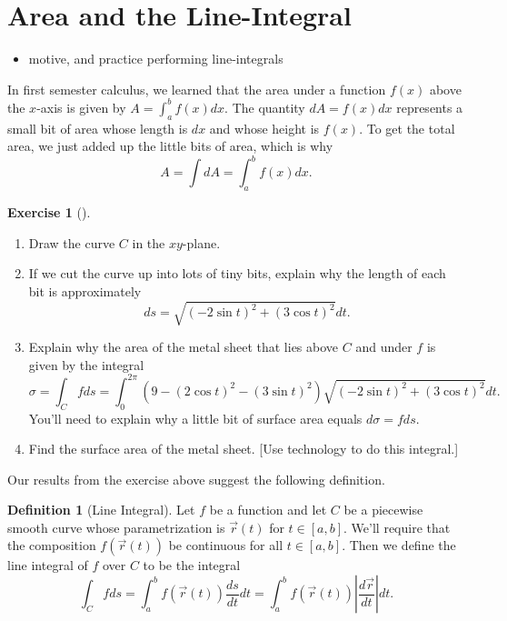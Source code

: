 \documentclass[10pt,]{book}
\theoremstyle{plain}
\theoremstyle{definition}
\newtheorem{definition}[theorem]{Definition}
\theoremstyle{definition}
\theoremstyle{definition}
\theoremstyle{definition}
\newtheorem{exploration}[project]{Exercise}
\theoremstyle{definition}
\numberwithin{equation}{section}
\begin{document}
\section[{Area and the Line-Integral}]{Area and the Line-Integral}\label{section-30}
\leavevmode%
\begin{itemize}[label=\textbullet]
\item{}motive, and practice performing line-integrals%
\end{itemize}
In first semester calculus, we learned that the area under a function \(f(x)\) above the \(x\)-axis is given by \(A = \int_a^b f(x) dx\). The quantity \(dA= f(x) dx\) represents a small bit of area whose length is \(dx\) and whose height is \(f(x)\). To get the total area, we just added up the little bits of area, which is why%
\begin{equation*}
A=\int dA = \int_a^b f(x) dx.
\end{equation*}
%
\begin{exploration}[]\label{exploration-196}
\leavevmode%
\begin{enumerate}[font=\bfseries,label=(\alph*),ref=\alph*]
\item\label{task-500} Draw the curve \(C\) in the \(xy\)-plane.%
\item\label{task-501} If we cut the curve up into lots of tiny bits, explain why the length of each bit is approximately%
\begin{equation*}
ds=\sqrt{(-2\sin t)^2+(3\cos t)^2}dt.
\end{equation*}
%
\item\label{task-502} Explain why the area of the metal sheet that lies above \(C\) and under \(f\) is given by the integral%
\begin{equation*}
\sigma = \int_C f ds = \int_0^{2\pi}(9-(2\cos t)^2-(3\sin t)^2)\sqrt{(-2\sin t)^2+(3\cos t)^2}dt.
\end{equation*}
You'll need to explain why a little bit of surface area equals \(d\sigma =fds\).%
\item\label{task-503} Find the surface area of the metal sheet. [Use technology to do this integral.]%
\end{enumerate}
\end{exploration}
Our results from the exercise above suggest the following definition.%
\begin{definition}[{Line Integral}]\label{definition-34}
Let \(f\) be a function and let \(C\) be a piecewise smooth curve whose parametrization is \(\vec r(t)\) for \(t\in[a,b]\). We'll require that the composition \(f(\vec r(t))\) be continuous for all \(t\in [a,b]\). Then we define the line integral of \(f\) over \(C\) to be the integral%
\begin{equation*}
\int_C f ds 
= \int_a^b f(\vec r(t))\frac{ds}{dt}dt
= \int_a^b f(\vec r(t))\left|\frac{d\vec r}{dt}\right|dt.
\end{equation*}
%
\end{definition}
\end{document}
